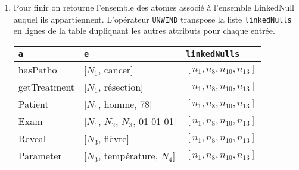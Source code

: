 \begin{example}
\begin{enumerate}[label=\emph{Etape~\arabic*},leftmargin=*]
		\item Pour finir on retourne l'ensemble des atomes associé à l'ensemble \textsf{LinkedNull} auquel ils appartiennent.
		      L'opérateur \verb|UNWIND| transpose la liste \verb|linkedNulls| en lignes de la table dupliquant les autres attributs pour chaque entrée.
		      \begin{center}
			      \begin{tabular}{lll}
				      \hline
				      \verb|a|     & \verb|e|                        & \verb|linkedNulls|               \\
				      \hline
				      hasPatho     & [$N_1$, cancer]                 & $[n_{1}, n_{8}, n_{10}, n_{13}]$ \\
				      getTreatment & [$N_1$, résection]              & $[n_{1}, n_{8}, n_{10}, n_{13}]$ \\
				      Patient      & [$N_1$, homme, 78]              & $[n_{1}, n_{8}, n_{10}, n_{13}]$ \\
				      Exam         & [$N_1$, $N_2$, $N_3$, 01-01-01] & $[n_{1}, n_{8}, n_{10}, n_{13}]$ \\
				      Reveal       & [$N_3$, fièvre]                 & $[n_{1}, n_{8}, n_{10}, n_{13}]$ \\
				      Parameter    & [$N_3$, température, $N_4$]     & $[n_{1}, n_{8}, n_{10}, n_{13}]$ \\
				      \hline
			      \end{tabular}
		      \end{center}
	\end{enumerate}
\end{example}

